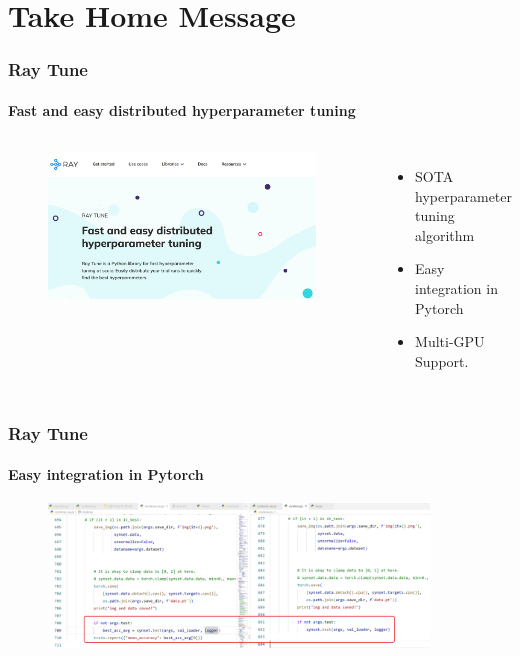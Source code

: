 \documentclass{beamer}
\begin{document}
\section{Take Home Message}
\begin{frame}
\frametitle{Ray Tune}
\framesubtitle{Fast and easy distributed hyperparameter tuning}

\begin{columns}
		\begin{figure}
			\centering
			\includegraphics[width=0.95\textwidth]
			{assets/ray}
		\end{figure}
	
		\begin{itemize}
			\item SOTA hyperparameter tuning algorithm
			\item Easy integration in Pytorch
			\item Multi-GPU Support.
			\end{itemize}
	\end{columns}
\end{frame}

\begin{frame}
\frametitle{Ray Tune}
\framesubtitle{Easy integration in Pytorch}
		\begin{figure}
			\centering
			\includegraphics[width=0.9\textwidth]
			{assets/code1}
		\end{figure}
\end{frame}
\end{document}
